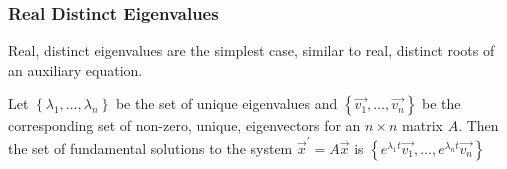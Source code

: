 \subsubsection{Real Distinct Eigenvalues}
\noindent
Real, distinct eigenvalues are the simplest case, similar to real, distinct roots of an auxiliary equation.
\begin{theorem}
	Let $\left\{\lambda_1, \ldots, \lambda_n\right\}$ be the set of unique eigenvalues and $\left\{\vec{v_1}, \ldots, \vec{v_n}\right\}$ be the corresponding set of non-zero, unique, eigenvectors for an $n \times n$ matrix $A$. Then the set of fundamental solutions to the system $\vec{x}^\prime = A\vec{x}$ is $\left\{e^{\lambda_1 t}\vec{v_1}, \ldots, e^{\lambda_n t}\vec{v_n} \right\}$
\end{theorem}

\ifodd{}\fi